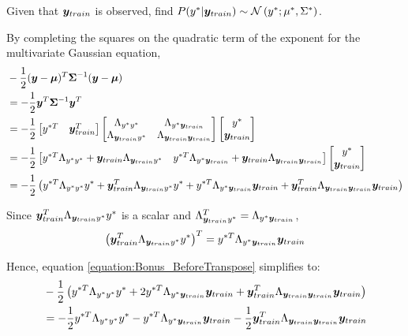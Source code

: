 \documentclass[a4paper,12pt]{article}
\begin{document}
Given that $\bm{y}_{train}$ is observed, find $P(y^* | \bm{y}_{train}) \sim \mathcal{N} 
\left( y^*; \mu^*, \Sigma^* \right)$. \vspace{1em}

By completing the squares on the quadratic term of the exponent for the multivariate Gaussian equation,
\begin{align}
	& - \frac{1}{2} ( \bm{y} - \bm{\mu} )^{T} \bm{\Sigma}^{-1} ( \bm{y} - \bm{\mu} ) \\
    & = - \frac{1}{2} \bm{y}^{T} \bm{\Sigma}^{-1} \bm{y}^{T} \\
    & = - \frac{1}{2} \begin{bmatrix} y^{*T} & \bm{y}_{train}^{T} \end{bmatrix}
    	\begin{bmatrix} \Lambda_{y^* y^*} & \Lambda_{y^* \bm{y}_{train}} \\ \Lambda_{\bm{y}_{train} y^*} & \Lambda_{\bm{y}_{train} \bm{y}_{train}} \end{bmatrix} \begin{bmatrix} y^* \\ \bm{y}_{train} \end{bmatrix} \\
    & = - \frac{1}{2} \begin{bmatrix} 
    		y^{*T} \Lambda_{y^* y^*} + \bm{y}_{train} \Lambda_{\bm{y}_{train} y^*} 
            & y^{*T} \Lambda_{y^* \bm{y}_{train}} + \bm{y}_{train} \Lambda_{\bm{y}_{train} \bm{y}_{train}} 
    	\end{bmatrix} \begin{bmatrix} y^* \\ \bm{y}_{train} \end{bmatrix} \\
    & \label{equation:Bonus_BeforeTranspose}= - \frac{1}{2} \left( 
    	y^{*T} \Lambda_{y^* y^*} y^* 
        + \bm{y}_{train}^{T} \Lambda_{\bm{y}_{train} y^*} y^*
        + y^{*T} \Lambda_{y^* \bm{y}_{train}} \bm{y}_{train}
        + \bm{y}_{train}^{T} \Lambda_{\bm{y}_{train} \bm{y}_{train}} \bm{y}_{train}
		\right)
\end{align}

Since $ \bm{y}_{train}^{T} \Lambda_{\bm{y}_{train} y^*} y^* $ is a scalar and 
$\Lambda_{\bm{y}_{train} y^*}^{T} = \Lambda_{y^* \bm{y}_{train}}$,
\begin{align}
	\left( \bm{y}_{train}^{T} \Lambda_{\bm{y}_{train} y^*} y^* \right)^{T} = 
    y^{*T} \Lambda_{y^* \bm{y}_{train}} \bm{y}_{train}
\end{align}

Hence, equation \ref{equation:Bonus_BeforeTranspose} simplifies to:
\begin{align}
	& - \frac{1}{2} \left(
    	y^{*T} \Lambda_{y^* y^*} y^* 
    	+ 2 y^{*T} \Lambda_{y^* \bm{y}_{train}} \bm{y}_{train}
    	+ \bm{y}_{train}^{T} \Lambda_{\bm{y}_{train} \bm{y}_{train}} \bm{y}_{train}
    	\right) \\
    & \label{equation:Bonus_AfterTranspose} = - \frac{1}{2} y^{*T} \Lambda_{y^* y^*} y^* 
    	- y^{*T} \Lambda_{y^* \bm{y}_{train}} \bm{y}_{train}
    	- \frac{1}{2} \bm{y}_{train}^{T} \Lambda_{\bm{y}_{train} \bm{y}_{train}} \bm{y}_{train}
\end{align}
\end{document}
